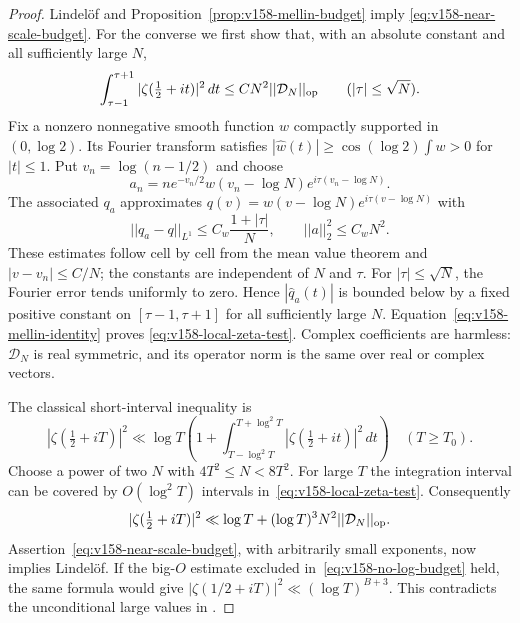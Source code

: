 \documentclass[11pt]{article}
\def\norm#1{||#1||}%
\theoremstyle{remark}
\newcommand{\norm}[1]{\left\lVert #1\right\rVert}
\begin{document}
\begin{proof}
Lindel\"of and Proposition~\ref{prop:v158-mellin-budget} imply
\eqref{eq:v158-near-scale-budget}. For the converse we first show that,
with an absolute constant and all sufficiently large $N$,
\begin{equation}
 \int_{\tau-1}^{\tau+1}|\zeta(\tfrac12+it)|^2\,dt
 \leq C N^2\norm{\mathcal D_N}_{\rm op}
 \qquad(|\tau|\leq\sqrt N).
 \label{eq:v158-local-zeta-test}
\end{equation}
Fix a nonzero nonnegative smooth function $w$ compactly supported in
$(0,\log2)$. Its Fourier transform satisfies
$|\widehat w(t)|\geq\cos(\log2)\int w>0$ for $|t|\leq1$.
Put $v_n=\log(n-1/2)$ and choose
\[
 a_n=n e^{-v_n/2}w(v_n-\log N)
                      e^{i\tau(v_n-\log N)}.
\]
The associated $q_a$ approximates
$q(v)=w(v-\log N)e^{i\tau(v-\log N)}$ with
\[
 \norm{q_a-q}_{L^1}\leq C_w\frac{1+|\tau|}{N},
 \qquad \norm{a}_2^2\leq C_w N^2.
\]
These estimates follow cell by cell from the mean value theorem and
$|v-v_n|\leq C/N$; the constants are independent of $N$ and $\tau$.
For $|\tau|\leq\sqrt N$, the Fourier error tends uniformly to zero.
Hence $|\widehat q_a(t)|$ is bounded below by a fixed positive constant
on $[\tau-1,\tau+1]$ for all sufficiently large $N$.
Equation~\eqref{eq:v158-mellin-identity} proves
\eqref{eq:v158-local-zeta-test}. Complex coefficients are harmless:
$\mathcal D_N$ is real symmetric, and its operator norm is the same
over real or complex vectors.

The classical short-interval inequality
\cite[Eq. (2.1)]{HuxleyIvic2007} is
\begin{equation}
 |\zeta(\tfrac12+iT)|^2\ll\log T
 \left(1+\int_{T-\log^2T}^{T+\log^2T}
                      |\zeta(\tfrac12+it)|^2\,dt\right)
 \quad(T\geq T_0).
 \label{eq:v158-short-interval}
\end{equation}
Choose a power of two $N$ with $4T^2\leq N<8T^2$.
For large $T$ the integration interval can be covered by
$O(\log^2T)$ intervals in~\eqref{eq:v158-local-zeta-test}.
Consequently
\begin{equation}
 |\zeta(\tfrac12+iT)|^2
 \ll\log T+(\log T)^3 N^2\norm{\mathcal D_N}_{\rm op}.
 \label{eq:v158-budget-to-zeta}
\end{equation}
Assertion~\eqref{eq:v158-near-scale-budget}, with arbitrarily small
exponents, now implies Lindel\"of.
If the big-$O$ estimate excluded in~\eqref{eq:v158-no-log-budget}
held, the same formula would give
$|\zeta(1/2+iT)|^2\ll(\log T)^{B+3}$.
This contradicts the unconditional large values in
\cite[Theorem 1]{Soundararajan2008}.
\end{proof}
\end{document}
